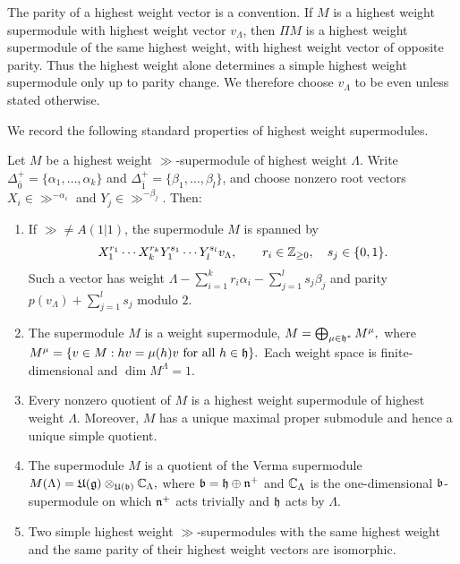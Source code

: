 \begin{remark}
The parity of a highest weight vector is a convention. If $M$ is a highest weight supermodule with highest weight vector $v_\Lambda$, then $\Pi M$ is a highest weight supermodule of the same highest weight, with highest weight vector of opposite parity. Thus the highest weight alone determines a simple highest weight supermodule only up to parity change. We therefore choose $v_\Lambda$ to be even unless stated otherwise.
\end{remark}

We record the following standard properties of highest weight supermodules.

\begin{lemma}\label{lemm::properties_HWM}
Let $M$ be a highest weight $\gg$-supermodule of highest weight $\Lambda$. Write $\Delta_{\bar0}^+=\{\alpha_1,\ldots,\alpha_k\}$ and $\Delta_{\bar1}^+=\{\beta_1,\ldots,\beta_l\}$, and choose nonzero root vectors $X_i\in\gg^{-\alpha_i}$ and $Y_j\in\gg^{-\beta_j}$. Then:
\begin{enumerate}
    \item[(a)] If $\gg\neq A(1\vert 1)$, the supermodule $M$ is spanned by
    \[
    X_1^{r_1}\cdots X_k^{r_k}Y_1^{s_1}\cdots Y_l^{s_l}v_\Lambda,
    \qquad
    r_i\in{\mathbb Z}_{\geq0},\quad s_j\in\{0,1\}.
    \]
    Such a vector has weight
    $
    \Lambda-\sum_{i=1}^k r_i\alpha_i-\sum_{j=1}^l s_j\beta_j
    $
    and parity
    $
    p(v_\Lambda)+\sum_{j=1}^l s_j
    $
    modulo $2$.

   \item[(b)] The supermodule $M$ is a weight supermodule,
$
M=\bigoplus_{\mu\in{\mathfrak h}^{\ast}}M^\mu,
$
where
$
M^\mu=\{v\in M:hv=\mu(h)v\text{ for all }h\in{\mathfrak h}\}.
$
Each weight space is finite-dimensional and $\dim M^\Lambda=1$.

    \item[(c)] Every nonzero quotient of $M$ is a highest weight supermodule of highest weight $\Lambda$. Moreover, $M$ has a unique maximal proper submodule and hence a unique simple quotient.

    \item[(d)] The supermodule $M$ is a quotient of the Verma supermodule
    $
    M(\Lambda)={\mathfrak U}({\mathfrak{g}})\otimes_{{\mathfrak U}({\mathfrak b})}{\mathbb C}_\Lambda,
    $
    where ${\mathfrak b}={\mathfrak h}\oplus{\mathfrak{n}}^+$ and ${\mathbb C}_\Lambda$ is the one-dimensional ${\mathfrak b}$-supermodule on which ${\mathfrak{n}}^+$ acts trivially and ${\mathfrak h}$ acts by $\Lambda$.

    \item[(e)] Two simple highest weight $\gg$-supermodules with the same highest weight and the same parity of their highest weight vectors are isomorphic.
\end{enumerate}
\end{lemma}

